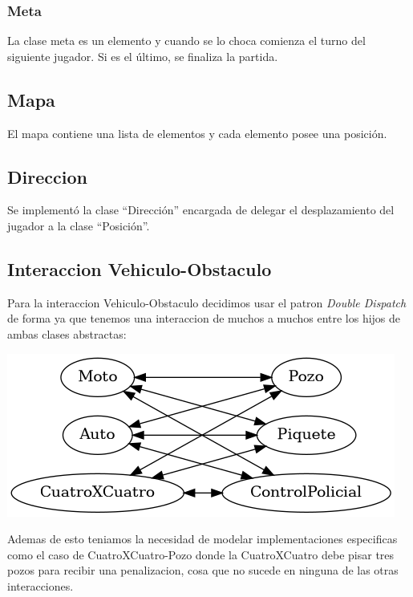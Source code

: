 \documentclass[titlepage,a4paper]{article}
\begin{document}
\subsubsection{Meta}
\label{sec:org3c6a4b4}
La clase meta es un elemento y cuando se lo choca comienza el turno
del siguiente jugador. Si es el último, se finaliza la partida.

\subsection{Mapa}
\label{sec:orge7cb2b3}

El mapa contiene una lista de elementos y cada elemento posee una posición.

\subsection{Direccion}
\label{sec:org31ffc9a}
Se implementó la clase “Dirección” encargada de delegar el
desplazamiento del jugador a la clase “Posición”.

\subsection{Interaccion Vehiculo-Obstaculo}
\label{sec:org8b37651}

Para la interaccion Vehiculo-Obstaculo decidimos usar el patron \emph{Double
Dispatch} de forma ya que tenemos una interaccion de muchos a muchos entre los
hijos de ambas clases abstractas:

\begin{center}
\includegraphics[width=.9\linewidth]{diagramas/interaccionVehiculoObstaculo.png}
\end{center}

Ademas de esto teniamos la necesidad de modelar implementaciones especificas
como el caso de CuatroXCuatro-Pozo donde la CuatroXCuatro debe pisar tres pozos
para recibir una penalizacion, cosa que no sucede en ninguna de las otras interacciones.
\end{document}
